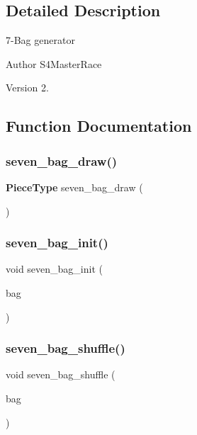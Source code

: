 \subsection{Detailed Description}
7-\/\+Bag generator 

\begin{DoxyAuthor}{Author}
S4\+Master\+Race 
\end{DoxyAuthor}
\begin{DoxyVersion}{Version}
2. 
\end{DoxyVersion}


\subsection{Function Documentation}
\mbox{\label{seven__bag_8c_a0da96f6a10a01d042e8b9487adb170d2}} 
\subsubsection{seven\+\_\+bag\+\_\+draw()}
{\footnotesize\ttfamily \textbf{ Piece\+Type} seven\+\_\+bag\+\_\+draw (\begin{DoxyParamCaption}{ }\end{DoxyParamCaption})}

\mbox{\label{seven__bag_8c_aaae86f9bd2c910ea459ee626ab35ad28}} 
\subsubsection{seven\+\_\+bag\+\_\+init()}
{\footnotesize\ttfamily void seven\+\_\+bag\+\_\+init (\begin{DoxyParamCaption}\item[{\textbf{ Piece\+Type} $\ast$}]{bag }\end{DoxyParamCaption})}

\mbox{\label{seven__bag_8c_a0db30dac70a7e9953f3709d2d12eeb0f}} 
\subsubsection{seven\+\_\+bag\+\_\+shuffle()}
{\footnotesize\ttfamily void seven\+\_\+bag\+\_\+shuffle (\begin{DoxyParamCaption}\item[{\textbf{ Piece\+Type} $\ast$}]{bag }\end{DoxyParamCaption})}


